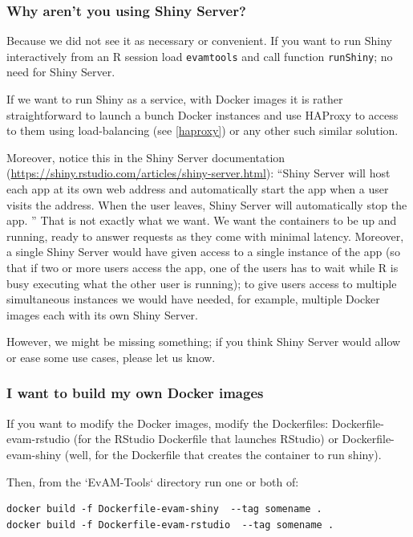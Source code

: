 \documentclass[a4paper,11pt]{article}
\begin{document}
\subsubsection{Why aren't you using Shiny Server?}
\label{sec:why-arent-you}

Because we did not see it as necessary or convenient. If you want to run Shiny interactively from an R session load \texttt{evamtools} and call function \texttt{runShiny}; no need for Shiny Server.

If we want to run Shiny as a service, with Docker images it is rather straightforward to launch a bunch Docker instances and use HAProxy to access to them using load-balancing (see \ref{haproxy}) or any other such similar solution.

Moreover, notice this in the Shiny Server documentation (\url{https://shiny.rstudio.com/articles/shiny-server.html}): ``Shiny Server will host each app at its own web address and automatically start the app when a user visits the address. When the user leaves, Shiny Server will automatically stop the app. ''  That is not exactly what we want. We want the containers to be up and running, ready to answer requests as they come with minimal latency. Moreover, a single Shiny Server would have given access to a single instance of the app (so that if two or more users access the app, one of the users has to wait while R is busy executing what the other user is running); to give users access to multiple simultaneous instances we would have needed, for example, multiple Docker images each with its own Shiny Server.

However, we might be missing something; if you think Shiny Server would allow or ease some use cases, please let us know.




\subsubsection{I want to build my own Docker images}

If you want to modify the Docker images, modify the Dockerfiles: Dockerfile-evam-rstudio (for the RStudio Dockerfile that launches RStudio) or Dockerfile-evam-shiny (well, for the Dockerfile that creates the container to run shiny). 


Then, from the `EvAM-Tools` directory run one or both of:

\begin{verbatim}
docker build -f Dockerfile-evam-shiny  --tag somename .
docker build -f Dockerfile-evam-rstudio  --tag somename .
\end{verbatim}
\end{document}
